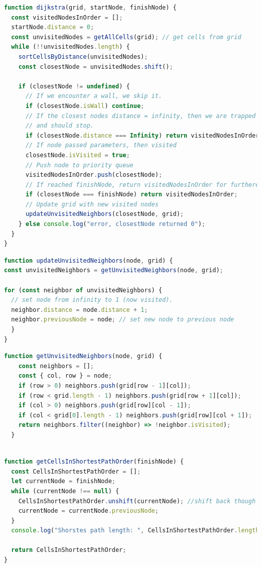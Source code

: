 \documentclass[12pt]{article}
\begin{document}
\begin{lstlisting}[language=JavaScript, caption=Kode for Dijkstra's Algoritme, label={lst:Dijkstra}]
function dijkstra(grid, startNode, finishNode) {
  const visitedNodesInOrder = [];
  startNode.distance = 0;
  const unvisitedNodes = getAllCells(grid); // get cells from grid
  while (!!unvisitedNodes.length) {
    sortCellsByDistance(unvisitedNodes);
    const closestNode = unvisitedNodes.shift();

    if (closestNode != undefined) {
      // If we encounter a wall, we skip it.
      if (closestNode.isWall) continue;
      // If the closest nodes distance = infinity, then we are trapped 
      // and should stop.
      if (closestNode.distance === Infinity) return visitedNodesInOrder;
      // If node passed parameters, then visited
      closestNode.isVisited = true; 
      // Push node to priority queue
      visitedNodesInOrder.push(closestNode);
      // If reached finishNode, return visitedNodesInOrder for furthere use.
      if (closestNode === finishNode) return visitedNodesInOrder;
      // Update grid with new visited nodes
      updateUnvisitedNeighbors(closestNode, grid); 
    } else console.log("error, closestNode returned 0");
  }
}
\end{lstlisting}
\begin{lstlisting}[language=JavaScript, caption=Kode for opdatering af unvisitedNodes]
function updateUnvisitedNeighbors(node, grid) {
const unvisitedNeighbors = getUnvisitedNeighbors(node, grid);

for (const neighbor of unvisitedNeighbors) {
  // set node from infinity to 1 (now visited).
  neighbor.distance = node.distance + 1;
  neighbor.previousNode = node; // set new node to previous node
  }
}
\end{lstlisting}
\begin{lstlisting}[language=JavaScript, caption=Kode for at søge nye nodes]
  function getUnvisitedNeighbors(node, grid) {
    const neighbors = [];
    const { col, row } = node;
    if (row > 0) neighbors.push(grid[row - 1][col]);
    if (row < grid.length - 1) neighbors.push(grid[row + 1][col]);
    if (col > 0) neighbors.push(grid[row][col - 1]);
    if (col < grid[0].length - 1) neighbors.push(grid[row][col + 1]);
    return neighbors.filter((neighbor) => !neighbor.isVisited);
  }
  
\end{lstlisting}
\begin{lstlisting}[language=JavaScript, caption=Kode for finde korteste vej]
  function getCellsInShortestPathOrder(finishNode) {
  const CellsInShortestPathOrder = [];
  let currentNode = finishNode;
  while (currentNode !== null) {
    CellsInShortestPathOrder.unshift(currentNode); //shift back though finishNode
    currentNode = currentNode.previousNode;
  }
  console.log("Shorstes path length: ", CellsInShortestPathOrder.length);

  return CellsInShortestPathOrder;
}
\end{lstlisting}
\end{document}
